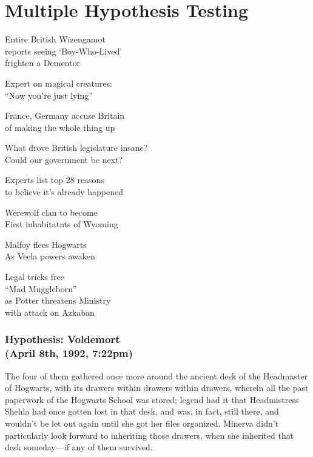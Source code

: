 \chapter{Multiple Hypothesis Testing}


\begin{headlines}


\label{Toronto Magical Tribune:}

Entire British Wizengamot\\reports seeing ‘Boy-Who-Lived’\\frighten a Dementor

Expert on magical creatures:\\“Now you’re just lying”

France, Germany accuse Britain\\of making the whole thing up

\label{New Zealand Spellcrafter’s Diurnal Notice:}

What drove British legislature insane?\\Could our government be next?

Experts list top 28 reasons\\to believe it’s already happened

\label{American Mage:}

Werewolf clan to become\\First inhabitatnts of Wyoming

\label{The Quibbler:}

Malfoy flees Hogwarts\\As Veela powers awaken

\label{Daily Prophet:}

Legal tricks free\\
“Mad Muggleborn”\\
as Potter threatens Ministry\\
with attack on Azkaban

\end{headlines}
\sbreakit

\subsection{Hypothesis: Voldemort\\(April 8th, 1992, 7:22pm)}

The four of them gathered once more around the ancient desk of the Headmaster of Hogwarts, with its drawers within drawers within drawers, wherein all the past paperwork of the Hogwarts School was stored; legend had it that Headmistress Shehla had once gotten lost in that desk, and was, in fact, still there, and wouldn’t be let out again until she got her files organized. Minerva didn’t particularly look forward to inheriting those drawers, when she inherited that desk someday—if any of them survived.


